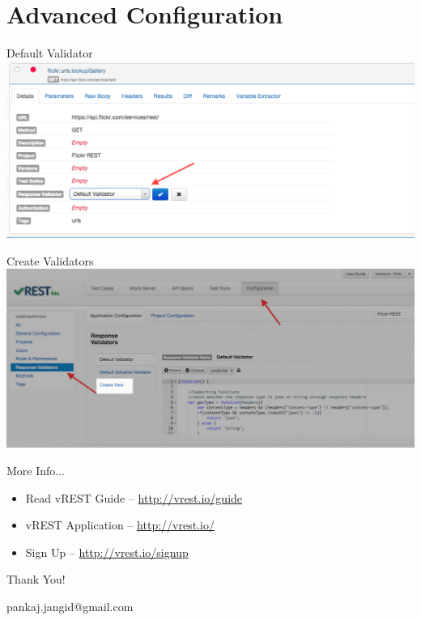 \documentclass{beamer}
\begin{document}
\section{Advanced Configuration}
\begin{frame}{Default Validator}
    \includegraphics[scale=0.30]{images/default_validator.PNG}
\end{frame}
\begin{frame}{Create Validators}
    \includegraphics[scale=0.30]{images/create_validators.PNG}
\end{frame}
\begin{frame}{More Info...}
    \begin{itemize}
        \item Read vREST Guide -- \href{http://vrest.io/guide}{http://vrest.io/guide}
        \item vREST Application -- \href{http://vrest.io/}{http://vrest.io/}
        \item Sign Up -- \href{http://vrest.io/signup}{http://vrest.io/signup}
    \end{itemize}
\end{frame}
\begin{frame}[plain,c]
    \begin{center}
        \huge Thank You! 
    \end{center}
    \begin{center}
        \small pankaj.jangid@gmail.com
    \end{center}
\end{frame}
\end{document}
